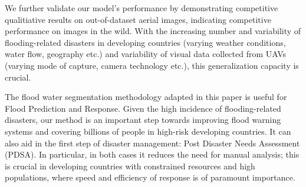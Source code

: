 \documentclass{article}
\begin{document}
We further validate our model's performance by demonstrating competitive qualitiative results on out-of-dataset aerial images, indicating competitive performance on images in the wild. With the increasing number and variability of flooding-related disasters in developing countries (varying weather conditions, water flow, geography etc.) and variability of visual data collected from UAVs (varying mode of capture, camera technology etc.), this generalization capacity is crucial. 


The flood water segmentation methodology adapted in this paper is useful for Flood Prediction and Response. Given the high incidence of flooding-related disasters, our method is an important step towards improving flood warning systems and covering billions of people in high-risk developing countries. It can also aid in the first step of disaster management: Post Disaster Needs Assessment (PDSA). In particular, in both cases it reduces the need for manual analysis; this is crucial in developing countries with constrained resources and high populations, where speed and efficiency of response is of paramount importance. 









\appendix



\newpage
{\small


}
\end{document}
